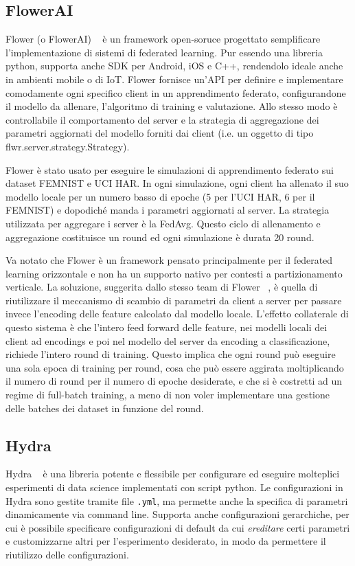 \subsection{FlowerAI}
Flower (o FlowerAI) ~\cite{flowerai} è un framework open-soruce progettato semplificare
l'implementazione di sistemi di federated learning. Pur essendo una 
libreria python, supporta anche SDK per Android, iOS e C++, rendendolo 
ideale anche in ambienti mobile o di IoT.
Flower fornisce un'API per definire e implementare comodamente ogni 
specifico client in un apprendimento federato, configurandone il modello
da allenare, l'algoritmo di training e valutazione. Allo stesso modo è 
controllabile il comportamento del server e la strategia di aggregazione 
dei parametri aggiornati del modello forniti dai client  (i.e. un oggetto
di tipo flwr.server.strategy.Strategy).

Flower è stato usato per eseguire le simulazioni di apprendimento 
federato sui dataset FEMNIST e UCI HAR. In ogni simulazione, ogni client 
ha allenato il suo modello locale per un numero basso di epoche (5 per 
l'UCI HAR, 6 per il FEMNIST) e dopodiché manda i parametri aggiornati 
al server. La strategia utilizzata per aggregare i server è la
FedAvg. Questo ciclo  di allenamento e aggregazione 
costituisce un round ed ogni simulazione 
è durata 20 round.

Va notato che Flower è un framework pensato principalmente per il 
federated learning orizzontale e non ha un supporto nativo per 
contesti a partizionamento verticale. La soluzione, suggerita dallo 
stesso team di Flower ~\cite{flower_vfl}, è quella di riutilizzare 
il meccanismo di scambio di parametri da client a server per passare
invece l'encoding delle feature calcolato dal modello locale. 
L'effetto collaterale di questo sistema è che l'intero feed forward 
delle feature, nei modelli locali dei client ad encodings e poi 
nel modello del server da encoding a classificazione, richiede l'intero 
round di training. Questo implica che ogni round può eseguire una sola
epoca di training per round, cosa che può essere aggirata moltiplicando
il numero di round per il numero di epoche desiderate, e che si è
costretti ad un regime di full-batch training, a meno di non voler 
implementare una gestione delle batches dei dataset in funzione del 
round.

\subsection{Hydra}
Hydra ~\cite{hydra} è una libreria potente e flessibile per configurare 
ed eseguire molteplici esperimenti di data science implementati con 
script python. Le configurazioni in Hydra sono gestite tramite file 
\texttt{.yml}, ma permette anche la specifica di parametri dinamicamente
via command line. Supporta anche configurazioni gerarchiche, per cui 
è possibile specificare configurazioni di default da cui \textit{ereditare}
certi parametri e customizzarne altri per l'esperimento desiderato, in 
modo da permettere il riutilizzo delle configurazioni.


